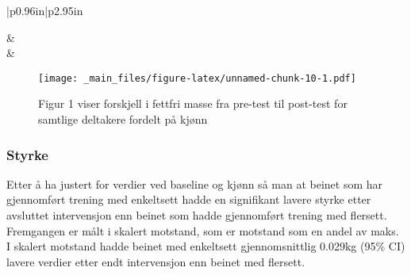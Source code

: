\documentclass[
]{book}
\begin{document}
\begin{longtable}[c]{|p{0.96in}|p{2.95in}}
\endfoot



 &  \\





 &  \\

\noalign{\global\setlength{\arrayrulewidth}{2pt}}



\end{longtable}

\begin{figure}
\centering
\texttt{[image: \_main\_files/figure-latex/unnamed-chunk-10-1.pdf]}
\caption{\label{fig:unnamed-chunk-10}Figur 1 viser forskjell i fettfri masse fra pre-test til post-test for samtlige deltakere fordelt på kjønn}
\end{figure}

\hypertarget{styrke}{%
\subsubsection{Styrke}\label{styrke}}

Etter å ha justert for verdier ved baseline og kjønn så man at beinet som har gjennomført trening med enkeltsett hadde en signifikant lavere styrke etter avsluttet intervensjon enn beinet som hadde gjennomført trening med flersett. Fremgangen er målt i skalert motstand, som er motstand som en andel av maks. I skalert motstand hadde beinet med enkeltsett gjennomsnittlig 0.029kg (95\% CI) lavere verdier etter endt intervensjon enn beinet med flersett.
\end{document}
